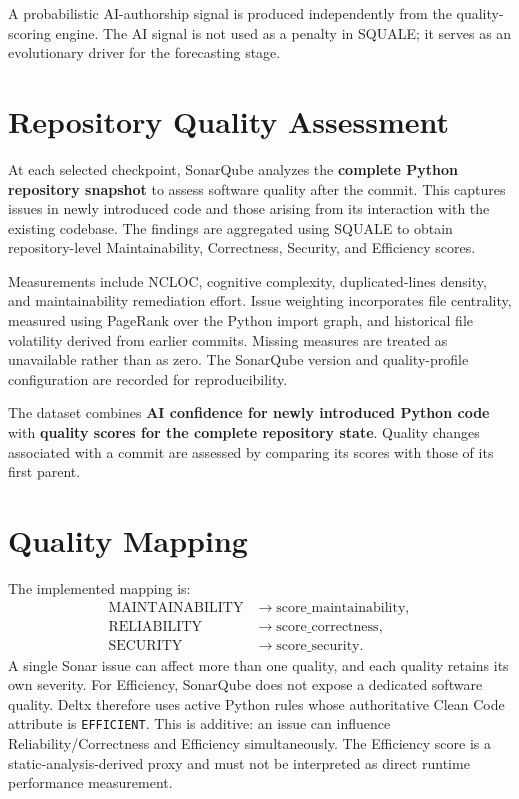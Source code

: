 \documentclass[12pt,a4paper,oneside]{report}
\newcommand{\code}[1]{\nolinkurl{#1}}
\begin{document}
A probabilistic AI-authorship signal is produced independently from the quality-scoring engine. The AI signal is not used as a penalty in SQUALE; it serves as an evolutionary driver for the forecasting stage.

\section{Repository Quality Assessment}
At each selected checkpoint, SonarQube analyzes the \textbf{complete Python repository snapshot} to assess software quality after the commit. This captures issues in newly introduced code and those arising from its interaction with the existing codebase. The findings are aggregated using SQUALE to obtain repository-level Maintainability, Correctness, Security, and Efficiency scores.

Measurements include NCLOC, cognitive complexity, duplicated-lines density, and maintainability remediation effort. Issue weighting incorporates file centrality, measured using PageRank over the Python import graph, and historical file volatility derived from earlier commits. Missing measures are treated as unavailable rather than as zero. The SonarQube version and quality-profile configuration are recorded for reproducibility.

The dataset combines \textbf{AI confidence for newly introduced Python code} with \textbf{quality scores for the complete repository state}. Quality changes associated with a commit are assessed by comparing its scores with those of its first parent.

\section{Quality Mapping}
The implemented mapping is:
\begin{align*}
\mathrm{MAINTAINABILITY} &\rightarrow \mathrm{score\_maintainability},\\
\mathrm{RELIABILITY} &\rightarrow \mathrm{score\_correctness},\\
\mathrm{SECURITY} &\rightarrow \mathrm{score\_security}.
\end{align*}
A single Sonar issue can affect more than one quality, and each quality retains its own severity. For Efficiency, SonarQube does not expose a dedicated software quality. Deltx therefore uses active Python rules whose authoritative Clean Code attribute is \code{EFFICIENT}. This is additive: an issue can influence Reliability/Correctness and Efficiency simultaneously. The Efficiency score is a static-analysis-derived proxy and must not be interpreted as direct runtime performance measurement.
\end{document}
